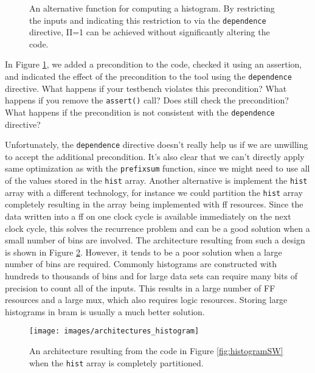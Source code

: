 \begin{figure}
{\footnotesize }
\caption{ An alternative function for computing a histogram.  By restricting the inputs and indicating this restriction to \VHLS via the \lstinline|dependence| directive, II=1 can be achieved without significantly altering the code. }
\label{fig:histogram_dependence}
\end{figure}

\begin{exercise}
In Figure \ref{fig:histogram_dependence}, we added a precondition to the code, checked it using an assertion, and indicated the effect of the precondition to the tool using the \lstinline|dependence| directive.  What happens if your testbench violates this precondition?  What happens if you remove the \lstinline|assert()| call?  Does \VHLS still check the precondition?   What happens if the precondition is not consistent with the \lstinline|dependence| directive?
\end{exercise}

Unfortunately, the \lstinline{dependence} directive doesn't really help us if we are unwilling to accept the additional precondition.  It's also clear that we can't directly apply same optimization as with the \lstinline|prefixsum| function, since we might need to use all of the values stored in the \lstinline|hist| array.  Another alternative is implement the \lstinline|hist| array with a different technology, for instance we could partition the \lstinline|hist| array completely resulting in the array being implemented with \gls{ff} resources.  Since the data written into a \gls{ff} on one clock cycle is available immediately on the next clock cycle, this solves the recurrence problem and can be a good solution when a small number of bins are involved.  The architecture resulting from such a design is shown in Figure \ref{fig:histogram_partitioned}.  However, it tends to be a poor solution when a large number of bins are required.  Commonly histograms are constructed with hundreds to thousands of bins and for large data sets can require many bits of precision to count all of the inputs.   This results in a large number of FF resources and a large mux, which also requires logic resources.  Storing large histograms in \gls{bram} is usually a much better solution.

\begin{figure}
\centering
{}
\texttt{[image: images/architectures\_histogram]}
\caption{ An architecture resulting from the code in Figure \ref{fig:histogramSW} when the \lstinline|hist| array is completely partitioned.}
\label{fig:histogram_partitioned}
\end{figure}

